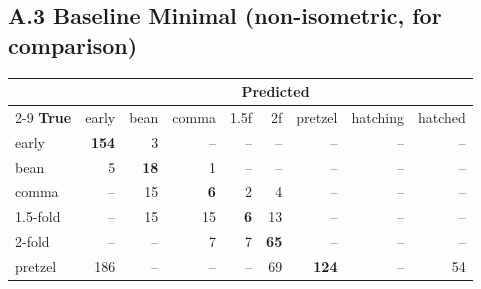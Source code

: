 \documentclass[11pt, a4paper]{article}
\begin{document}
\subsection*{A.3 Baseline Minimal (non-isometric, for comparison)}

\begin{center}
\small
\begin{tabular}{@{}l*{8}{r}@{}}
\toprule
& \multicolumn{8}{c}{\textbf{Predicted}} \\
\cmidrule(l){2-9}
\textbf{True} & early & bean & comma & 1.5f & 2f & pretzel & hatching & hatched \\
\midrule
early    & \textbf{154} & 3 & -- & -- & -- & -- & -- & -- \\
bean     & 5 & \textbf{18} & 1 & -- & -- & -- & -- & -- \\
comma    & -- & 15 & \textbf{6} & 2 & 4 & -- & -- & -- \\
1.5-fold & -- & 15 & 15 & \textbf{6} & 13 & -- & -- & -- \\
2-fold   & -- & -- & 7 & 7 & \textbf{65} & -- & -- & -- \\
pretzel  & 186 & -- & -- & -- & 69 & \textbf{124} & -- & 54 \\
\bottomrule
\end{tabular}
\end{center}
\end{document}

